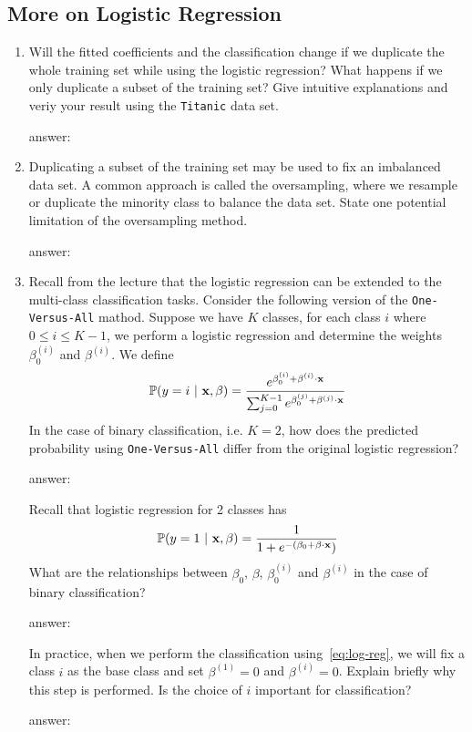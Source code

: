 \documentclass{article}
\newcommand{\answerbox}[1]{
	\begin{center}
		\ifdefined\printsol
			\begin{mdframed}
				\begin{minipage}{0.95\textwidth}
					{\color{blue} {#1}}
				\end{minipage}
			\end{mdframed}
		\else
			\begin{mdframed}
				\begin{minipage}{0.95\textwidth}
					\phantom{\parbox{\linewidth}{#1}}
				\end{minipage}
			\end{mdframed}
		\fi
		\end{center}
	}
\begin{document}
\bigskip

\subsection*{More on Logistic Regression}
\begin{enumerate}
\item

Will the fitted coefficients and the classification change if we duplicate the
whole training set while using the logistic regression? What happens if we only
duplicate a subset of the training set? Give intuitive explanations and veriy
your result using the \texttt{Titanic} data set.

\answerbox{answer:
}

\item Duplicating a subset of the training set may be used to fix an imbalanced data set. A common
approach is called the oversampling, where we resample or duplicate the minority class to balance the data set. State one potential limitation of the oversampling method.
\answerbox{
answer:
}

\item Recall from the lecture that the logistic regression can be extended
to the multi-class classification tasks. Consider the following version of
the \texttt{One-Versus-All} mathod. Suppose we have $K$ classes, for each
class $i$ where $0\le i\le K-1$, we perform a logistic regression and
determine the weights $\beta_0^{(i)}$ and $\beta^{(i)}$. We define
\begin{equation}
	\mathbb{P}(y=i\ |\ {\bf
	x},\beta)=
	\frac{e^{\beta_0^{(i)}+{\beta^{(i)}} \cdot \bf{x}}}{
		\sum_{j=0}^{K-1}e^{\beta_0^{(j)}+{\beta^{(j)}} \cdot \bf{x}}
	}
	\label{eq:log-reg}
\end{equation}
In the case of binary classification, i.e. $K=2$, how does the
predicted probability using \texttt{One-Versus-All} differ from the
original logistic regression?
\answerbox{ answer:}

Recall that logistic regression for 2 classes has
\[
	\mathbb{P}(y=1\ |\ {\bf{x}},\beta) =
	\frac{1}{1+e^{-(\beta_0 + \beta \cdot \bf{x}})}
\]
What are the relationships between $\beta_0$, $\beta$, $\beta_0^{(i)}$ and
$\beta^{(i)}$ in the case of binary classification?
\answerbox{
	answer:
}
In practice, when we perform the classification using~\eqref{eq:log-reg}, we
will fix a class $i$ as the base class and set $\beta^{(1)} = 0$ and
$\beta^{(i)} = 0$. Explain briefly why this step is performed. Is the choice of
$i$ important for classification?
\answerbox{
answer:
}


\end{enumerate}
\end{document}
